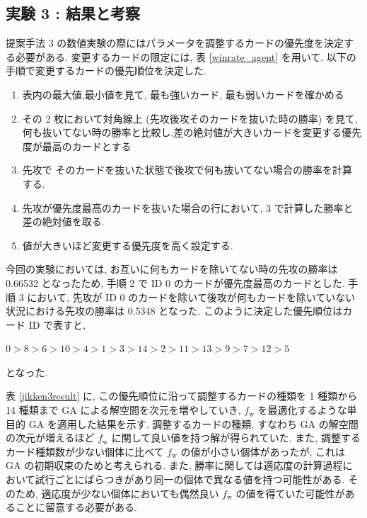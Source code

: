 \documentclass[12pt]{jarticle}
\begin{document}
\subsection{実験 3 : 結果と考察}
提案手法 3 の数値実験の際にはパラメータを調整するカードの優先度を決定する必要がある.
変更するカードの限定には, 表 \ref{winrate_agent} を用いて, 以下の手順で変更するカードの優先順位を決定した. 
\begin{enumerate}
  \item 表内の最大値,最小値を見て, 最も強いカード, 最も弱いカードを確かめる
  \item その 2 枚において対角線上 (先攻後攻そのカードを抜いた時の勝率) を見て, 何も抜いてない時の勝率と比較し,差の絶対値が大きいカードを変更する優先度が最高のカードとする
  \item 先攻で そのカードを抜いた状態で後攻で何も抜いてない場合の勝率を計算する.
  \item 先攻が優先度最高のカードを抜いた場合の行において, 3 で計算した勝率と差の絶対値を取る. 
  \item 値が大きいほど変更する優先度を高く設定する.
\end{enumerate}
今回の実験においては, お互いに何もカードを除いてない時の先攻の勝率は 0.66532 となったため, 手順 2 で ID 0 のカードが優先度最高のカードとした. 手順 3 において, 先攻が ID 0 のカードを除いて後攻が何もカードを除いていない状況における先攻の勝率は 0.5348 となった. 
このように決定した優先順位はカード ID で表すと, \par
$0 > 8 > 6 > 10 > 4 > 1 > 3 > 14 > 2 > 11 > 13 > 9 > 7 > 12 > 5$ \par
となった. \par
表 \ref{jikken3result} に, この優先順位に沿って調整するカードの種類を 1 種類から 14 種類まで GA による解空間を次元を増やしていき, $f_\mathrm{w}$ を最適化するような単目的 GA を適用した結果を示す.
調整するカードの種類, すなわち GA の解空間の次元が増えるほど $f_\mathrm{w}$ に関して良い値を持つ解が得られていた. また, 調整するカード種類数が少ない個体に比べて $f_\mathrm{w}$ の値が小さい個体があったが, これは GA の初期収束のためと考えられる. また, 勝率に関しては適応度の計算過程において試行ごとにばらつきがあり同一の個体で異なる値を持つ可能性がある. そのため, 適応度が少ない個体においても偶然良い $f_\mathrm{w}$ の値を得ていた可能性があることに留意する必要がある. \par
\end{document}
